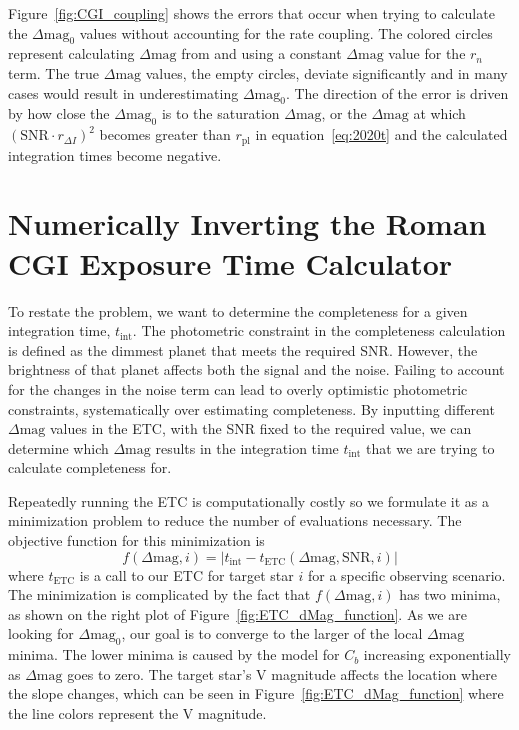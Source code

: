 Figure~\ref{fig:CGI_coupling} shows the errors that occur when trying to
calculate the $\Delta\textrm{mag}_0$ values without accounting for the rate
coupling. The colored circles represent calculating $\Delta\textrm{mag}$
from  and using a constant
$\Delta\textrm{mag}$ value for the $r_n$ term. The true $\Delta\textrm{mag}$
values, the empty circles, deviate significantly and in many cases would result
in underestimating $\Delta\textrm{mag}_0$. The direction of the error is driven
by how close the $\Delta\textrm{mag}_0$ is to the saturation
$\Delta\textrm{mag}$, or the $\Delta\textrm{mag}$ at which $\left(\textrm{SNR}
\cdot r_{\Delta I}\right)^2$ becomes greater than $r_{\textrm{pl}}$ in
equation~\ref{eq:2020t} and the calculated integration times become
negative.



\section{Numerically Inverting the Roman CGI Exposure Time Calculator}
\label{sec:numerically_inverting_ETC}

To restate the problem, we want to determine the completeness for a given
integration time, $t_{\textrm{int}}$. The photometric constraint in the
completeness calculation is defined as the dimmest planet that meets the
required SNR. However, the brightness of that planet affects both the signal
and the noise. Failing to account for the changes in the noise term can lead to
overly optimistic photometric constraints, systematically over estimating
completeness. By inputting different $\Delta\textrm{mag}$ values in the
ETC, with the SNR fixed to the required value, we can
determine which $\Delta\textrm{mag}$ results in the integration time
$t_{\textrm{int}}$ that we are trying to calculate completeness for.

Repeatedly running the ETC is computationally costly so we formulate it as a
minimization problem to reduce the number of evaluations necessary. The
objective function for this minimization is
\begin{equation}
  f(\Delta\textrm{mag}, i) = |t_{\textrm{int}} -
  t_{\textrm{ETC}}(\Delta\textrm{mag}, \textrm{SNR}, i)|
  \label{eq:intTime_root_obj}
\end{equation}
where $t_{\textrm{ETC}}$ is a call to our ETC for target star $i$ for a
specific observing scenario. The minimization is complicated by the fact that
$f\left(\Delta\textrm{mag}, i\right)$ has two minima, as shown on the right plot of
Figure~\ref{fig:ETC_dMag_function}. As we are looking for
$\Delta\textrm{mag}_0$, our goal is to converge to the larger of the local
$\Delta\textrm{mag}$ minima. The lower minima is caused by the model for $C_b$
increasing exponentially as $\Delta\textrm{mag}$ goes to zero. The target
star's V magnitude affects the location where the slope changes, which can be seen in Figure~\ref{fig:ETC_dMag_function} where the line colors represent
the V magnitude.

